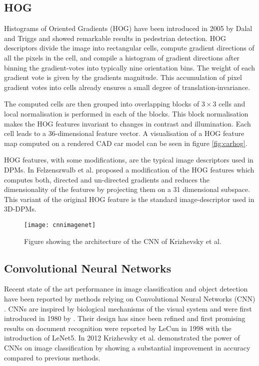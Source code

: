 \subsection{HOG}
Histograms of Oriented Gradients (HOG) have been introduced in 2005 by Dalal and Triggs \cite{1467360} and showed remarkable results in pedestrian detection. HOG descriptors divide the image into rectangular cells, compute gradient directions of all the pixels in the cell, and compile a histogram of gradient directions after binning the gradient-votes into typically nine orientation bins. The weight of each gradient vote is given by the gradients magnitude. This accumulation of pixel gradient votes into cells already ensures a small degree of translation-invariance. 

The computed cells are then grouped into overlapping blocks of $3\times3$ cells and local normalisation is performed in each of the blocks. This block normalisation makes the HOG features invariant to changes in contrast and illumination. Each cell leads to a 36-dimensional feature vector. A visualisation of a HOG feature map computed on a rendered CAD car model can be seen in figure \ref{fig:carhog}.

HOG features, with some modifications, are the typical image descriptors used in DPMs. In \cite{5255236} Felzenszwalb et al. proposed a modification of the HOG features which computes both, directed and un-directed gradients and reduces the dimensionality of the features by projecting them on a 31 dimensional subspace.  This variant of the original HOG feature is the standard image-descriptor used in 3D-DPMs.

\begin{figure}
\begin{center}
\texttt{[image: cnnimagenet]}
\caption{Figure showing the architecture of the CNN of Krizhevsky et al. \cite{krizhevsky2012imagenet}}
\label{fig:cnn}
\end{center}
\end{figure}

\subsection{Convolutional Neural Networks}
Recent state of the art performance in image classification and object detection have been reported by methods relying on Convolutional Neural Networks (CNN) \cite{krizhevsky2012imagenet}\cite{girshick2013rich}. CNNs are inspired by biological mechanisms of the visual system and were first introduced in 1980 by \cite{fukushima1980neocognitron}. Their design has since been refined and first promising results on document recognition were reported by LeCun \cite{lecun1998gradient} in 1998 with the introduction of LeNet5. In 2012 Krizhevsky et al. \cite{krizhevsky2012imagenet}  demonstrated the power of CNNs on image classification by showing a substantial improvement in accuracy compared to previous methods.

